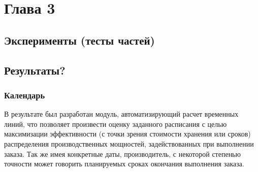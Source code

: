 \chapter{Глава 3}
\section{Эксперименты (тесты частей)}
\section{Результаты?}
\subsection{Календарь}
В результате был разработан модуль, автоматизирующий расчет временных линий, что позволяет произвести оценку заданного расписания с целью максимизации эффективности (с точки зрения стоимости хранения или сроков) распределения производственных мощностей, задействованных при выполнении заказа. Так же имея конкретные даты, производитель, с некоторой степенью точности может говорить планируемых сроках окончания выполнения заказа.
